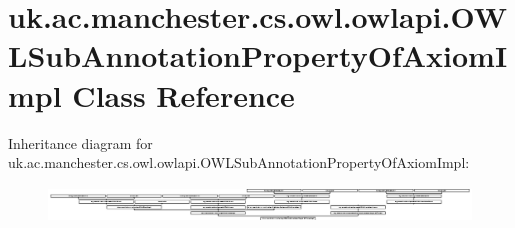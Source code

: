 \hypertarget{classuk_1_1ac_1_1manchester_1_1cs_1_1owl_1_1owlapi_1_1_o_w_l_sub_annotation_property_of_axiom_impl}{\section{uk.\-ac.\-manchester.\-cs.\-owl.\-owlapi.\-O\-W\-L\-Sub\-Annotation\-Property\-Of\-Axiom\-Impl Class Reference}
\label{classuk_1_1ac_1_1manchester_1_1cs_1_1owl_1_1owlapi_1_1_o_w_l_sub_annotation_property_of_axiom_impl}
}
Inheritance diagram for uk.\-ac.\-manchester.\-cs.\-owl.\-owlapi.\-O\-W\-L\-Sub\-Annotation\-Property\-Of\-Axiom\-Impl\-:\begin{figure}[H]
\begin{center}
\leavevmode
\includegraphics[height=0.956720cm]{classuk_1_1ac_1_1manchester_1_1cs_1_1owl_1_1owlapi_1_1_o_w_l_sub_annotation_property_of_axiom_impl}
\end{center}
\end{figure}
